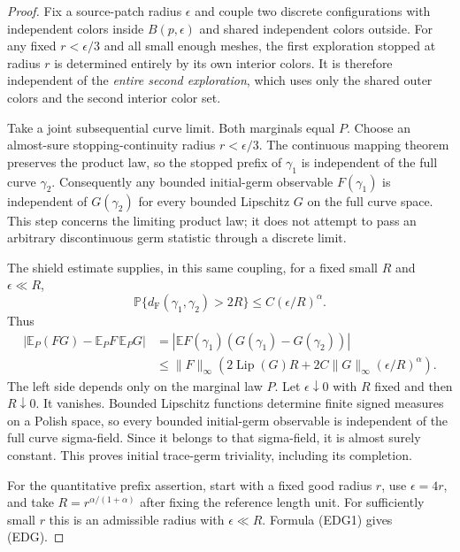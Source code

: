 \documentclass[11pt]{article}
\theoremstyle{definition}\newtheorem{definition}[theorem]{Definition}
\theoremstyle{remark}\newtheorem{remark}[theorem]{Remark}
\begin{document}
\begin{proof}
Fix a source-patch radius $\epsilon$ and couple two discrete
configurations with independent colors inside $B(p,\epsilon)$ and shared
independent colors outside. For any fixed $r<\epsilon/3$ and all small
enough meshes, the first exploration stopped at radius $r$ is determined
entirely by its own interior colors. It is therefore independent of the
\emph{entire second exploration}, which uses only the shared outer colors
and the second interior color set.

Take a joint subsequential curve limit. Both marginals equal $P$. Choose
an almost-sure stopping-continuity radius $r<\epsilon/3$. The continuous
mapping theorem preserves the product law, so the stopped prefix of
$\gamma_1$ is independent of the full curve $\gamma_2$. Consequently
any bounded initial-germ observable $F(\gamma_1)$ is independent of
$G(\gamma_2)$ for every bounded Lipschitz $G$ on the full curve space.
This step concerns the limiting product law; it does not attempt to pass
an arbitrary discontinuous germ statistic through a discrete limit.

The shield estimate supplies, in this same coupling, for a fixed small
$R$ and $\epsilon\ll R$,
\[
 \mathbb P\{d_{\mathrm F}(\gamma_1,\gamma_2)>2R\}
       \leq C(\epsilon/R)^\alpha.
\]
Thus
\begin{align*}
 \left|\mathbb E_P(FG)-\mathbb E_PF\,\mathbb E_PG\right|
 &=\left|\mathbb E
       F(\gamma_1)(G(\gamma_1)-G(\gamma_2))\right|\\
 &\leq\|F\|_\infty
   \left(2\operatorname{Lip}(G)R+
           2C\|G\|_\infty(\epsilon/R)^\alpha\right).
 \tag{EDG1}
\end{align*}
The left side depends only on the marginal law $P$. Let
$\epsilon\downarrow0$ with $R$ fixed and then $R\downarrow0$.
It vanishes. Bounded Lipschitz functions determine finite signed
measures on a Polish space, so every bounded initial-germ observable
is independent of the full curve sigma-field. Since it belongs to
that sigma-field, it is almost surely constant. This proves initial
trace-germ triviality, including its completion.

For the quantitative prefix assertion, start with a fixed good radius
$r$, use $\epsilon=4r$, and take
$R=r^{\alpha/(1+\alpha)}$ after fixing the reference length unit.
For sufficiently small $r$ this is an admissible radius with
$\epsilon\ll R$. Formula (EDG1) gives (EDG).
\end{proof}
\end{document}
